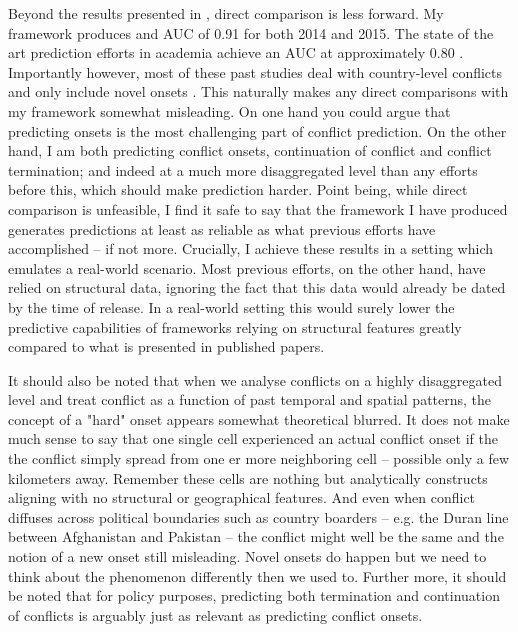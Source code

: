 \documentclass[a4paper]{article}
\begin{document}
Beyond the results presented in \cite{Maase}, direct comparison is less forward. My framework produces and AUC of 0.91 for both 2014 and 2015. The state of the art prediction efforts in academia achieve an AUC at approximately 0.80 \citep[14]{chadefaux2017conflict}. Importantly however, most of these past studies deal with country-level conflicts and only include novel onsets \citep[14]{chadefaux2017conflict}. This naturally makes any direct comparisons with my framework somewhat misleading. On one hand you could argue that predicting onsets is the most challenging part of conflict prediction. On the other hand, I am both predicting conflict onsets, continuation of conflict and conflict termination; and indeed at a much more disaggregated level than any efforts before this, which should make prediction harder. Point being, while direct comparison is unfeasible, I find it safe to say that the framework I have produced generates predictions at least as reliable as what previous efforts have accomplished -- if not more. Crucially, I achieve these results in a setting which emulates a real-world scenario. Most previous efforts, on the other hand, have relied on structural data, ignoring the fact that this data would already be dated by the time of release. In a real-world setting this would surely lower the predictive capabilities of frameworks relying on structural features greatly compared to what is presented in published papers.\par

It should also be noted that when we analyse conflicts on a highly disaggregated level and treat conflict as a function of past temporal and spatial patterns, the concept of a "hard" onset appears somewhat theoretical blurred. It does not make much sense to say that one single cell experienced an actual conflict onset if the the conflict simply spread from one er more neighboring cell -- possible only a few kilometers away. Remember these cells are nothing but analytically constructs aligning with no structural or geographical features. And even when conflict diffuses across political boundaries such as country boarders  -- e.g. the Duran line between Afghanistan and Pakistan --  the conflict might well be the same and the notion of a new onset still misleading. Novel onsets do happen but we need to think about the phenomenon differently then we used to. Further more, it should be noted that for policy purposes, predicting both termination and continuation of conflicts is arguably just as relevant as predicting conflict onsets.\par  
\end{document}
